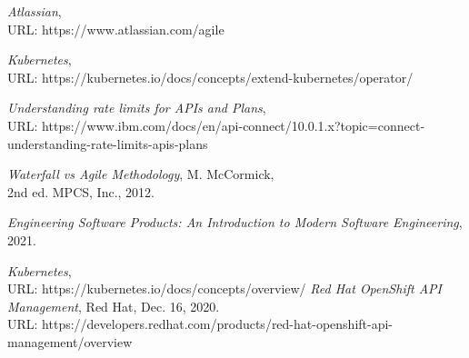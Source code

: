 \documentclass{article}
\begin{document}
\clearpage
\begin{thebibliography}{9}


\emph{Atlassian}, \\URL: https://www.atlassian.com/agile 

\emph{Kubernetes}, \\URL: https://kubernetes.io/docs/concepts/extend-kubernetes/operator/

\emph{Understanding rate limits for APIs and Plans}, \\URL: https://www.ibm.com/docs/en/api-connect/10.0.1.x?topic=connect-understanding-rate-limits-apis-plans

\emph{Waterfall vs Agile Methodology}, M. McCormick, \\2nd ed. MPCS, Inc., 2012.

\emph{Engineering Software Products: An Introduction to Modern Software Engineering}, 2021.
  
\emph{Kubernetes}, \\URL: https://kubernetes.io/docs/concepts/overview/  
\emph{Red Hat OpenShift API Management}, Red Hat, Dec. 16, 2020. 
\\URL: https://developers.redhat.com/products/red-hat-openshift-api-management/overview
  


\end{thebibliography}
\end{document}

